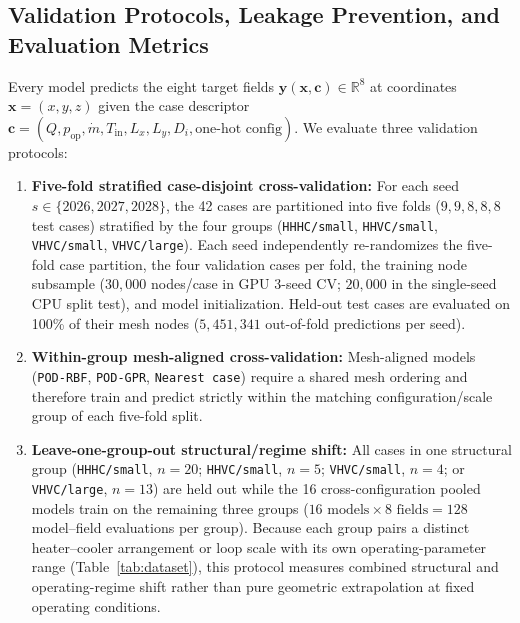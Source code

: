 \documentclass[11pt]{article}
\begin{document}
\subsection{Validation Protocols, Leakage Prevention, and Evaluation Metrics}
Every model predicts the eight target fields $\mathbf{y}(\mathbf{x}, \mathbf{c}) \in \mathbb{R}^8$ at coordinates $\mathbf{x} = (x,y,z)$ given the case descriptor $\mathbf{c} = (Q, p_{\mathrm{op}}, \dot{m}, T_{\mathrm{in}}, L_x, L_y, D_i, \text{one-hot config})$. We evaluate three validation protocols:
\begin{enumerate}
  \item \textbf{Five-fold stratified case-disjoint cross-validation:} For each seed $s \in \{2026, 2027, 2028\}$, the 42 cases are partitioned into five folds ($9, 9, 8, 8, 8$ test cases) stratified by the four groups (\texttt{HHHC/small}, \texttt{HHVC/small}, \texttt{VHVC/small}, \texttt{VHVC/large}). Each seed independently re-randomizes the five-fold case partition, the four validation cases per fold, the training node subsample ($30,000$ nodes/case in GPU 3-seed CV; $20,000$ in the single-seed CPU split test), and model initialization. Held-out test cases are evaluated on 100\% of their mesh nodes ($5,451,341$ out-of-fold predictions per seed).
  \item \textbf{Within-group mesh-aligned cross-validation:} Mesh-aligned models (\texttt{POD-RBF}, \texttt{POD-GPR}, \texttt{Nearest case}) require a shared mesh ordering and therefore train and predict strictly within the matching configuration/scale group of each five-fold split.
  \item \textbf{Leave-one-group-out structural/regime shift:} All cases in one structural group (\texttt{HHHC/small}, $n=20$; \texttt{HHVC/small}, $n=5$; \texttt{VHVC/small}, $n=4$; or \texttt{VHVC/large}, $n=13$) are held out while the 16 cross-configuration pooled models train on the remaining three groups ($16\text{ models} \times 8\text{ fields} = 128$ model--field evaluations per group). Because each group pairs a distinct heater--cooler arrangement or loop scale with its own operating-parameter range (Table~\ref{tab:dataset}), this protocol measures combined structural and operating-regime shift rather than pure geometric extrapolation at fixed operating conditions.
\end{enumerate}
\end{document}
